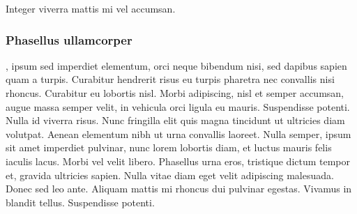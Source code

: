 \documentclass[a4paper,parskip=half,oneside]{scrbook}
\begin{document}
Integer viverra mattis mi vel accumsan.

\subsubsection{Phasellus ullamcorper}, ipsum sed imperdiet elementum, orci neque bibendum nisi, 
sed dapibus sapien quam a turpis. Curabitur hendrerit risus eu turpis pharetra nec convallis nisi rhoncus. 
Curabitur eu lobortis nisl. Morbi adipiscing, nisl et semper accumsan, augue massa semper velit, 
in vehicula orci ligula eu mauris. Suspendisse potenti. Nulla id viverra risus. 
Nunc fringilla elit quis magna tincidunt ut ultricies diam 
volutpat. Aenean elementum nibh ut urna convallis laoreet. Nulla semper, ipsum sit amet imperdiet pulvinar, nunc lorem lobortis diam, et luctus mauris felis iaculis lacus. Morbi vel velit libero. Phasellus urna eros, tristique dictum tempor et, gravida ultricies sapien. Nulla vitae diam eget velit adipiscing malesuada. Donec sed leo ante. Aliquam mattis mi rhoncus dui pulvinar egestas. Vivamus in blandit tellus. Suspendisse potenti.
\end{document}
